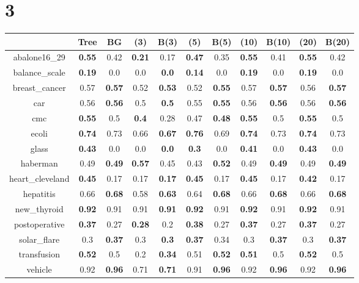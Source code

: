 \documentclass{article}%
\begin{document}
\section*{3}%
\begin{tabular}{c|cccccccccc}%
\hline%
&Tree&BG&(3)&B(3)&(5)&B(5)&(10)&B(10)&(20)&B(20)\\%
\hline%
abalone16\_29&\textbf{0.55}&0.42&\textbf{0.21}&0.17&\textbf{0.47}&0.35&\textbf{0.55}&0.41&\textbf{0.55}&0.42\\%
\hline%
balance\_scale&\textbf{0.19}&0.0&0.0&\textbf{0.0}&\textbf{0.14}&0.0&\textbf{0.19}&0.0&\textbf{0.19}&0.0\\%
\hline%
breast\_cancer&0.57&\textbf{0.57}&0.52&\textbf{0.53}&0.52&\textbf{0.55}&0.57&\textbf{0.57}&0.56&\textbf{0.57}\\%
\hline%
car&0.56&\textbf{0.56}&0.5&\textbf{0.5}&0.55&\textbf{0.55}&0.56&\textbf{0.56}&0.56&\textbf{0.56}\\%
\hline%
cmc&\textbf{0.55}&0.5&\textbf{0.4}&0.28&0.47&\textbf{0.48}&\textbf{0.55}&0.5&\textbf{0.55}&0.5\\%
\hline%
ecoli&\textbf{0.74}&0.73&0.66&\textbf{0.67}&\textbf{0.76}&0.69&\textbf{0.74}&0.73&\textbf{0.74}&0.73\\%
\hline%
glass&\textbf{0.43}&0.0&0.0&\textbf{0.0}&\textbf{0.3}&0.0&\textbf{0.41}&0.0&\textbf{0.43}&0.0\\%
\hline%
haberman&0.49&\textbf{0.49}&\textbf{0.57}&0.45&0.43&\textbf{0.52}&0.49&\textbf{0.49}&0.49&\textbf{0.49}\\%
\hline%
heart\_cleveland&\textbf{0.45}&0.17&0.17&\textbf{0.17}&\textbf{0.45}&0.17&\textbf{0.45}&0.17&\textbf{0.42}&0.17\\%
\hline%
hepatitis&0.66&\textbf{0.68}&0.58&\textbf{0.63}&0.64&\textbf{0.68}&0.66&\textbf{0.68}&0.66&\textbf{0.68}\\%
\hline%
new\_thyroid&\textbf{0.92}&0.91&0.91&\textbf{0.91}&\textbf{0.92}&0.91&\textbf{0.92}&0.91&\textbf{0.92}&0.91\\%
\hline%
postoperative&\textbf{0.37}&0.27&\textbf{0.28}&0.2&\textbf{0.38}&0.27&\textbf{0.37}&0.27&\textbf{0.37}&0.27\\%
\hline%
solar\_flare&0.3&\textbf{0.37}&0.3&\textbf{0.3}&\textbf{0.37}&0.34&0.3&\textbf{0.37}&0.3&\textbf{0.37}\\%
\hline%
transfusion&\textbf{0.52}&0.5&0.2&\textbf{0.34}&0.51&\textbf{0.52}&\textbf{0.51}&0.5&\textbf{0.52}&0.5\\%
\hline%
vehicle&0.92&\textbf{0.96}&0.71&\textbf{0.71}&0.91&\textbf{0.96}&0.92&\textbf{0.96}&0.92&\textbf{0.96}\\%

\end{tabular}
\end{document}
